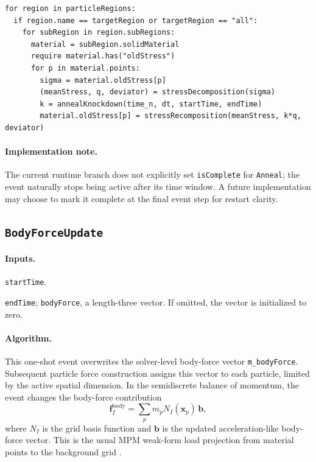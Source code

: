 \begin{lstlisting}[caption={Anneal event pseudocode.}]
for region in particleRegions:
  if region.name == targetRegion or targetRegion == "all":
    for subRegion in region.subRegions:
      material = subRegion.solidMaterial
      require material.has("oldStress")
      for p in material.points:
        sigma = material.oldStress[p]
        (meanStress, q, deviator) = stressDecomposition(sigma)
        k = annealKnockdown(time_n, dt, startTime, endTime)
        material.oldStress[p] = stressRecomposition(meanStress, k*q, deviator)
\end{lstlisting}

\paragraph{Implementation note.}
The current runtime branch does not explicitly set \texttt{isComplete} for \texttt{Anneal}; the event naturally stops being active after its time window.  A future implementation may choose to mark it complete at the final event step for restart clarity.

\subsection{\texttt{BodyForceUpdate}}
\label{subsec:event-body-force-update}

\paragraph{Inputs.}
\begin{description}[leftmargin=*,style=nextline]
\item[\textbf{Required.}] \texttt{startTime}.
\item[\textbf{Optional.}] \texttt{endTime}; \texttt{bodyForce}, a length-three vector.  If omitted, the vector is initialized to zero.
\end{description}

\paragraph{Algorithm.}
This one-shot event overwrites the solver-level body-force vector \texttt{m\_bodyForce}.  Subsequent particle force construction assigns this vector to each particle, limited by the active spatial dimension.  In the semidiscrete balance of momentum, the event changes the body-force contribution
\begin{equation}
  \mathbf{f}^{\mathrm{body}}_I
  = \sum_p m_p N_I(\mathbf{x}_p)\,\mathbf{b},
  \label{eq:body-force-p2g}
\end{equation}
where $N_I$ is the grid basis function and $\mathbf{b}$ is the updated acceleration-like body-force vector.  This is the usual MPM weak-form load projection from material points to the background grid \cite{sulsky1994history,sulsky1995solid}.

